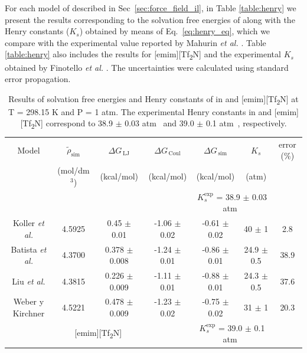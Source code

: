 \documentclass[3p,twocolumn]{elsarticle}
\begin{document}
For each model of \ce{[emim][B(CN)_4]} described in Sec~\ref{sec:force_field_il}, in Table \ref{table:henry} we present the results corresponding to the solvation free energies of  along with the Henry constants ($K_s$) obtained by means of Eq.~\ref{eq:henry_eq}, which we compare with the experimental value reported by Mahurin \textit{et al.} \cite{Mahurin_2010}. Table \ref{table:henry} also includes the results for [emim][Tf\textsubscript{2}N] and the experimental $K_s$ obtained by Finotello \textit{et al.} \cite{Finotello_2008}. The uncertainties were calculated using standard error propagation.

\begin{table}
\centering
\begin{adjustbox}{width=1\textwidth}
\begin{threeparttable}
\caption{Results of solvation free energies and Henry constants of  in \ce{[emim][B(CN)_4]} and [emim][Tf\textsubscript{2}N] at T = 298.15 K and P = 1 atm. The experimental Henry constants in \ce{[emim][B(CN)_4]} and [emim][Tf\textsubscript{2}N] correspond to 38.9 $\pm$ 0.03 atm~\cite{Mahurin_2010} and 39.0 $\pm$ 0.1 atm~\cite{Finotello_2008}, respectively.}
\begin{tabular}{ c c c  c  c  c  c }  
\toprule
Model & $\tilde{\rho}_{\text{sim}}$ & $\Delta G_{\,\text{LJ}}$  & $\Delta G_{\,\text{Coul}}$  & $\Delta G_{\,\text{sim}}$ & $K_{s}$ & error (\%)\tnote{a}\\
& (mol/dm$^{3}$) & (kcal/mol) & (kcal/mol) &  (kcal/mol) & (atm)  &  \\
			\hline
			\multicolumn{4}{c}{\ce{[emim][B(CN)_4]}} & \multicolumn{2}{c}{\cellcolor{gray!25}$K_{s}^{\text{exp}}$ = 38.9 $\pm$ 0.03 atm~\cite{Mahurin_2010}}\\
			\hline
Koller \textit{et al.} \cite{Koller_2012} & 4.5925 & 0.45 $\pm$ 0.01 & -1.06 $\pm$ 0.02 & -0.61 $\pm$ 0.02 & 40 $\pm$ 1 & 2.8 \\
Batista \textit{et al.} \cite{Batista_2015} & 4.3700 & 0.378 $\pm$ 0.008 & -1.24 $\pm$ 0.01  & -0.86 $\pm$ 0.01 & 24.9 $\pm$ 0.5 & 38.9 \\
Liu \textit{et al.} \cite{Liu_2014} & 4.3815 & 0.226 $\pm$ 0.009 & -1.11 $\pm$ 0.01 & -0.88 $\pm$ 0.01 & 24.3 $\pm$ 0.5 & 37.6  \\
Weber y Kirchner \cite{Weber_2016} & 4.5221 & 0.478 $\pm$ 0.009 & -1.23 $\pm$ 0.02 & -0.75 $\pm$ 0.02 & 31 $\pm$ 1 & 20.3  \\
\hline
		\multicolumn{4}{c}{[emim][Tf\textsubscript{2}N]} & \multicolumn{2}{c}{ \cellcolor{gray!25} $K_{s}^{\text{exp}}$ = 39.0 $\pm$ 0.1 atm~\cite{Finotello_2008}}\\

\end{tabular}
\end{threeparttable}
\end{adjustbox}
\end{table}
\end{document}
